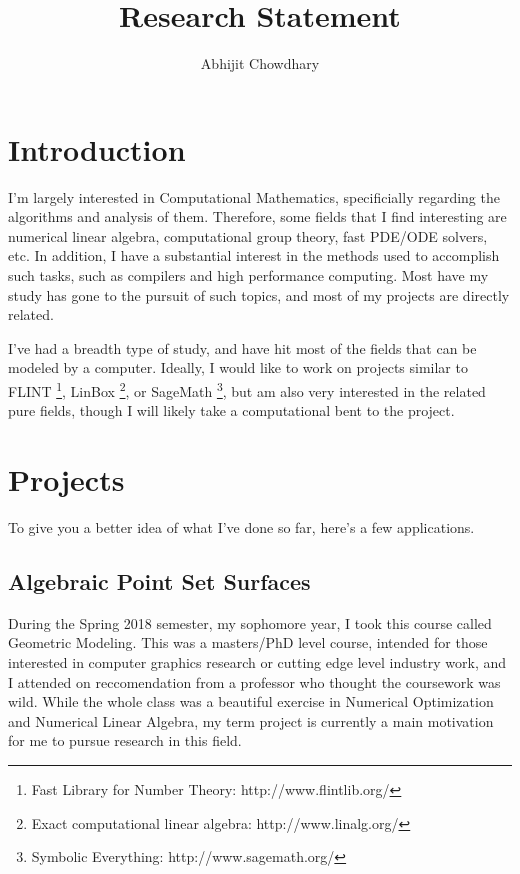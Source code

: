 \documentclass[12pt]{article}
\begin{document}
 

 
\title{Research Statement}%
\author{Abhijit Chowdhary\\ %
} %

\maketitle

\section{Introduction}

I'm largely interested in Computational Mathematics, specificially regarding the
algorithms and analysis of them. Therefore, some fields that I find interesting
are numerical linear algebra, computational group theory, fast PDE/ODE solvers,
etc. In addition, I have a substantial interest in the methods used to
accomplish such tasks, such as compilers and high performance computing. Most
have my study has gone to the pursuit of such topics, and most of my projects are
directly related.

I've had a breadth type of study, and have hit most of the fields that can be
modeled by a computer. Ideally, I would like to work on projects similar to
FLINT \footnote{Fast Library for Number Theory: http://www.flintlib.org/},
LinBox \footnote{Exact computational linear algebra: http://www.linalg.org/}, or
SageMath \footnote{Symbolic Everything: http://www.sagemath.org/}, but am also
very interested in the related pure fields, though I will likely take a
computational bent to the project.

\section{Projects}

To give you a better idea of what I've done so far, here's a few applications.

\subsection{Algebraic Point Set Surfaces}

During the Spring 2018 semester, my sophomore year, I took this course called
Geometric Modeling. This was a masters/PhD level course, intended for those
interested in computer graphics research or cutting edge level industry work,
and I attended on reccomendation from a professor who thought the coursework was
wild. While the whole class was a beautiful exercise in Numerical Optimization
and Numerical Linear Algebra, my term project is currently a main motivation for
me to pursue research in this field.
\end{document}
